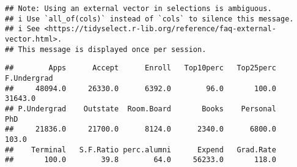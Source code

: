 \documentclass[]{article}
\newenvironment{Shaded}{\begin{snugshade}}{\end{snugshade}}
\newcommand{\CommentTok}[1]{\textcolor[rgb]{0.56,0.35,0.01}{\textit{#1}}}
\newcommand{\DataTypeTok}[1]{\textcolor[rgb]{0.13,0.29,0.53}{#1}}
\newcommand{\KeywordTok}[1]{\textcolor[rgb]{0.13,0.29,0.53}{\textbf{#1}}}
\newcommand{\NormalTok}[1]{#1}
\newcommand{\OperatorTok}[1]{\textcolor[rgb]{0.81,0.36,0.00}{\textbf{#1}}}
\newcommand{\OtherTok}[1]{\textcolor[rgb]{0.56,0.35,0.01}{#1}}
\newcommand{\StringTok}[1]{\textcolor[rgb]{0.31,0.60,0.02}{#1}}
\begin{document}
\begin{Shaded}
\end{Shaded}

\begin{verbatim}
## Note: Using an external vector in selections is ambiguous.
## i Use `all_of(cols)` instead of `cols` to silence this message.
## i See <https://tidyselect.r-lib.org/reference/faq-external-vector.html>.
## This message is displayed once per session.
\end{verbatim}

\begin{verbatim}
##        Apps      Accept      Enroll   Top10perc   Top25perc F.Undergrad 
##     48094.0     26330.0      6392.0        96.0       100.0     31643.0 
## P.Undergrad    Outstate  Room.Board       Books    Personal         PhD 
##     21836.0     21700.0      8124.0      2340.0      6800.0       103.0 
##    Terminal   S.F.Ratio perc.alumni      Expend   Grad.Rate 
##       100.0        39.8        64.0     56233.0       118.0
\end{verbatim}
\end{document}
